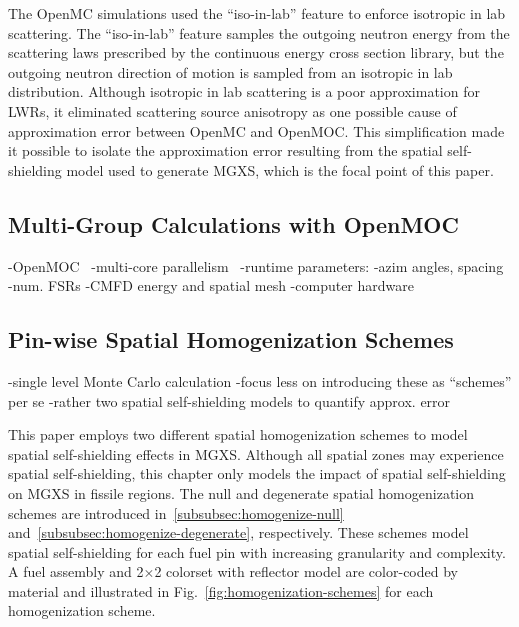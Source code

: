 The OpenMC simulations used the ``iso-in-lab'' feature to enforce isotropic in lab scattering. The ``iso-in-lab'' feature samples the outgoing neutron energy from the scattering laws prescribed by the continuous energy cross section library, but the outgoing neutron direction of motion is sampled from an isotropic in lab distribution. Although isotropic in lab scattering is a poor approximation for LWRs, it eliminated scattering source anisotropy as one possible cause of approximation error between OpenMC and OpenMOC. This simplification made it possible to isolate the approximation error resulting from the spatial self-shielding model used to generate MGXS, which is the focal point of this paper.

\subsection{Multi-Group Calculations with OpenMOC}
\label{subsec:openmoc}

-OpenMOC~\cite{boyd2014openmoc}
-multi-core parallelism~\cite{boyd2016parallel}
-runtime parameters:
  -azim angles, spacing
  -num. FSRs
  -CMFD energy and spatial mesh
  -computer hardware


\subsection{Pin-wise Spatial Homogenization Schemes}
\label{subsec:homogenize}

-single level Monte Carlo calculation
-focus less on introducing these as ``schemes'' per se
  -rather two spatial self-shielding models to quantify approx. error

This paper employs two different spatial homogenization schemes to model spatial self-shielding effects in MGXS. Although all spatial zones may experience spatial self-shielding, this chapter only models the impact of spatial self-shielding on MGXS in fissile regions. The null and degenerate spatial homogenization schemes are introduced in~\autoref{subsubsec:homogenize-null} and~\autoref{subsubsec:homogenize-degenerate}, respectively. These schemes model spatial self-shielding for each fuel pin with increasing granularity and complexity. A fuel assembly and 2$\times$2 colorset with reflector model are color-coded by material and illustrated in Fig.~\ref{fig:homogenization-schemes} for each homogenization scheme.

